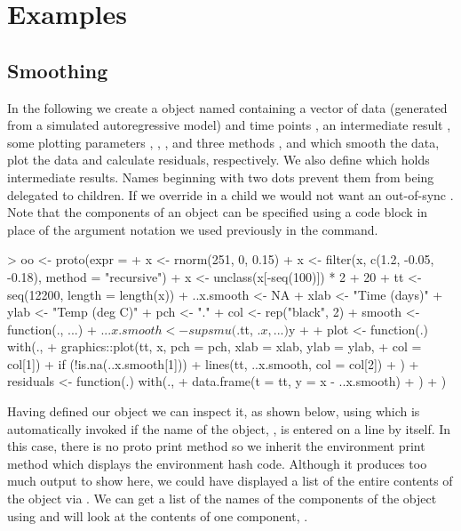 \documentclass{Z}
\begin{document}
\section{Examples} 
\label{sec:examples}

\subsection{Smoothing}
\label{sec:smooth}

In the following we create a  object named 
containing a vector of data  (generated from a simulated
autoregressive model) and time points
, an intermediate result
, some plotting parameters , ,
,  and three methods , 
and  which smooth the data, plot the data and
calculate residuals, respectively.  We also define 
which holds intermediate results.  Names beginning with two dots
prevent them from being delegated to children.  If we override
 in a child we would not want an out-of-sync .
Note that the components of an object can be specified using a code
block in place of the argument notation we used previously in the
 command.

\begin{Schunk}
\begin{Sinput}
> oo <- proto(expr = {
+     x <- rnorm(251, 0, 0.15)
+     x <- filter(x, c(1.2, -0.05, -0.18), method = "recursive")
+     x <- unclass(x[-seq(100)]) * 2 + 20
+     tt <- seq(12200, length = length(x))
+     ..x.smooth <- NA
+     xlab <- "Time (days)"
+     ylab <- "Temp (deg C)"
+     pch <- "."
+     col <- rep("black", 2)
+     smooth <- function(., ...) {
+         .$..x.smooth <- supsmu(.$tt, .$x, ...)$y
+     }
+     plot <- function(.) with(., {
+         graphics::plot(tt, x, pch = pch, xlab = xlab, ylab = ylab, 
+             col = col[1])
+         if (!is.na(..x.smooth[1])) 
+             lines(tt, ..x.smooth, col = col[2])
+     })
+     residuals <- function(.) with(., {
+         data.frame(t = tt, y = x - ..x.smooth)
+     })
+ })
\end{Sinput}
\end{Schunk}

Having defined our  object we can inspect it, as shown
below, using 
 which is automatically invoked if the
name of the object, , is entered on a line by itself.  
In this case, there is no proto print method so we inherit the
environment print method which displays the environment hash code.  
Although it produces too much output to show here,
we could have displayed a 
list of the entire contents of the object 
via .
We can get a list of the names of the 
components of the object using  and will look
at the contents of one component, .
\end{document}
